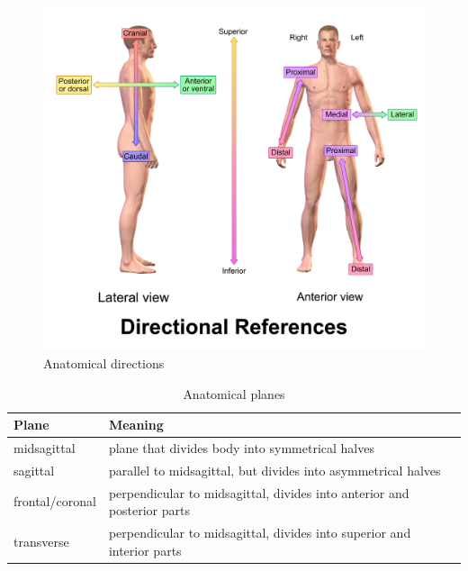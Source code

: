 \begin{figure}[htbp]
  \centering
  \includegraphics[width=0.9\linewidth]{img/Blausen_0019_AnatomicalDirectionalReferences.png}
  \caption{Anatomical directions}
  \label{fig:directions}
\end{figure}

\begin{table}[htbp]
  \centering
  \begin{tabularx}{\linewidth}{lX}
    \toprule
    Plane & Meaning \\
    \midrule
    midsagittal & plane that divides body into symmetrical halves \\
    sagittal & parallel to midsagittal, but divides into asymmetrical halves \\
    frontal/coronal & perpendicular to midsagittal, divides into anterior and posterior parts \\
    transverse & perpendicular to midsagittal, divides into superior and interior parts \\
    \bottomrule
  \end{tabularx}
  \caption{Anatomical planes}
  \label{tab:anatomical-planes}
\end{table}

